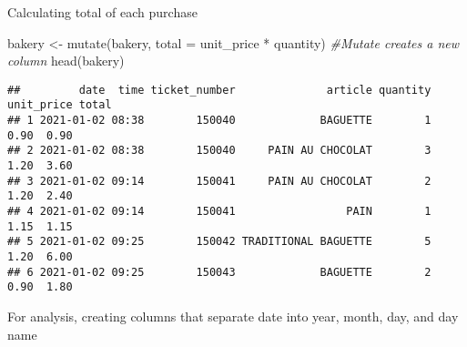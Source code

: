 \documentclass[
]{article}
\newenvironment{Shaded}{\begin{snugshade}}{\end{snugshade}}
\newcommand{\AttributeTok}[1]{\textcolor[rgb]{0.77,0.63,0.00}{#1}}
\newcommand{\CommentTok}[1]{\textcolor[rgb]{0.56,0.35,0.01}{\textit{#1}}}
\newcommand{\FunctionTok}[1]{\textcolor[rgb]{0.00,0.00,0.00}{#1}}
\newcommand{\NormalTok}[1]{#1}
\newcommand{\OtherTok}[1]{\textcolor[rgb]{0.56,0.35,0.01}{#1}}
\newcommand{\SpecialCharTok}[1]{\textcolor[rgb]{0.00,0.00,0.00}{#1}}
\newcommand{\StringTok}[1]{\textcolor[rgb]{0.31,0.60,0.02}{#1}}
\begin{document}
Calculating total of each purchase

\begin{Shaded}
\begin{Highlighting}[]
\NormalTok{bakery }\OtherTok{\textless{}{-}} \FunctionTok{mutate}\NormalTok{(bakery, }\AttributeTok{total =}\NormalTok{ unit\_price }\SpecialCharTok{*}\NormalTok{ quantity) }\CommentTok{\#Mutate creates a new column}
\FunctionTok{head}\NormalTok{(bakery)}
\end{Highlighting}
\end{Shaded}

\begin{verbatim}
##         date  time ticket_number              article quantity unit_price total
## 1 2021-01-02 08:38        150040             BAGUETTE        1       0.90  0.90
## 2 2021-01-02 08:38        150040     PAIN AU CHOCOLAT        3       1.20  3.60
## 3 2021-01-02 09:14        150041     PAIN AU CHOCOLAT        2       1.20  2.40
## 4 2021-01-02 09:14        150041                 PAIN        1       1.15  1.15
## 5 2021-01-02 09:25        150042 TRADITIONAL BAGUETTE        5       1.20  6.00
## 6 2021-01-02 09:25        150043             BAGUETTE        2       0.90  1.80
\end{verbatim}

For analysis, creating columns that separate date into year, month, day,
and day name

\begin{Shaded}
\end{Shaded}
\end{document}
